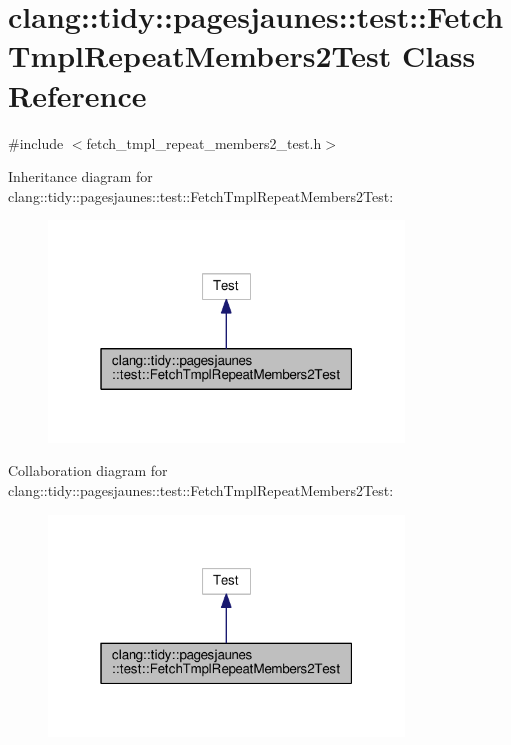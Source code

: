 \hypertarget{classclang_1_1tidy_1_1pagesjaunes_1_1test_1_1_fetch_tmpl_repeat_members2_test}{}\section{clang\+:\+:tidy\+:\+:pagesjaunes\+:\+:test\+:\+:Fetch\+Tmpl\+Repeat\+Members2\+Test Class Reference}
\label{classclang_1_1tidy_1_1pagesjaunes_1_1test_1_1_fetch_tmpl_repeat_members2_test}


{\ttfamily \#include $<$fetch\+\_\+tmpl\+\_\+repeat\+\_\+members2\+\_\+test.\+h$>$}



Inheritance diagram for clang\+:\+:tidy\+:\+:pagesjaunes\+:\+:test\+:\+:Fetch\+Tmpl\+Repeat\+Members2\+Test\+:
\nopagebreak
\begin{figure}[H]
\begin{center}
\leavevmode
\includegraphics[width=268pt]{classclang_1_1tidy_1_1pagesjaunes_1_1test_1_1_fetch_tmpl_repeat_members2_test__inherit__graph}
\end{center}
\end{figure}


Collaboration diagram for clang\+:\+:tidy\+:\+:pagesjaunes\+:\+:test\+:\+:Fetch\+Tmpl\+Repeat\+Members2\+Test\+:
\nopagebreak
\begin{figure}[H]
\begin{center}
\leavevmode
\includegraphics[width=268pt]{classclang_1_1tidy_1_1pagesjaunes_1_1test_1_1_fetch_tmpl_repeat_members2_test__coll__graph}
\end{center}
\end{figure}
